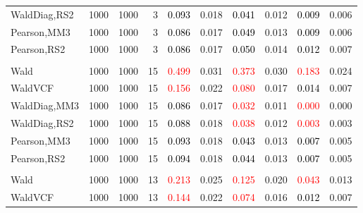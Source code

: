 \documentclass[
]{article}
\begin{document}
\begin{table}[H]
{\begin{tabular}[t]{lrrrrrrlrr}
\hspace{1em}WaldDiag,RS2 & 1000 & 1000 & 3 & \textcolor{black}{0.093} & 0.018 & \textcolor{black}{0.041} & 0.012 & \textcolor{black}{0.009} & 0.006\\
\hspace{1em}Pearson,MM3 & 1000 & 1000 & 3 & \textcolor{black}{0.086} & 0.017 & \textcolor{black}{0.049} & 0.013 & \textcolor{black}{0.009} & 0.006\\
\hspace{1em}Pearson,RS2 & 1000 & 1000 & 3 & \textcolor{black}{0.086} & 0.017 & \textcolor{black}{0.050} & 0.014 & \textcolor{black}{0.012} & 0.007\\
\addlinespace[0.3em]
\multicolumn{10}{l}{\textbf{1F 15V}}\\
\hspace{1em}Wald & 1000 & 1000 & 15 & \textcolor{red}{0.499} & 0.031 & \textcolor{red}{0.373} & 0.030 & \textcolor{red}{0.183} & 0.024\\
\hspace{1em}WaldVCF & 1000 & 1000 & 15 & \textcolor{red}{0.156} & 0.022 & \textcolor{red}{0.080} & 0.017 & \textcolor{black}{0.014} & 0.007\\
\hspace{1em}WaldDiag,MM3 & 1000 & 1000 & 15 & \textcolor{black}{0.086} & 0.017 & \textcolor{red}{0.032} & 0.011 & \textcolor{red}{0.000} & 0.000\\
\hspace{1em}WaldDiag,RS2 & 1000 & 1000 & 15 & \textcolor{black}{0.088} & 0.018 & \textcolor{red}{0.038} & 0.012 & \textcolor{red}{0.003} & 0.003\\
\hspace{1em}Pearson,MM3 & 1000 & 1000 & 15 & \textcolor{black}{0.093} & 0.018 & \textcolor{black}{0.043} & 0.013 & \textcolor{black}{0.007} & 0.005\\
\hspace{1em}Pearson,RS2 & 1000 & 1000 & 15 & \textcolor{black}{0.094} & 0.018 & \textcolor{black}{0.044} & 0.013 & \textcolor{black}{0.007} & 0.005\\
\addlinespace[0.3em]
\multicolumn{10}{l}{\textbf{2F 10V}}\\
\hspace{1em}Wald & 1000 & 1000 & 13 & \textcolor{red}{0.213} & 0.025 & \textcolor{red}{0.125} & 0.020 & \textcolor{red}{0.043} & 0.013\\
\hspace{1em}WaldVCF & 1000 & 1000 & 13 & \textcolor{red}{0.144} & 0.022 & \textcolor{red}{0.074} & 0.016 & \textcolor{black}{0.012} & 0.007\\

\end{tabular}}
\end{table}
\end{document}
